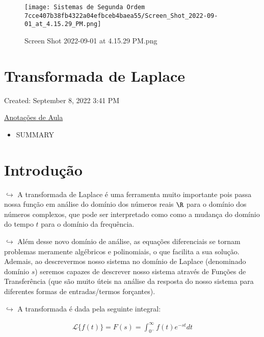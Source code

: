\documentclass[]{article}
\providecommand{\tightlist}{%
  \setlength{\itemsep}{0pt}\setlength{\parskip}{0pt}}
\begin{document}
  \begin{figure}
  \centering
  \texttt{[image: Sistemas de Segunda Ordem 7cce407b38fb4322a04efbceb4baea55/Screen\_Shot\_2022-09-01\_at\_4.15.29\_PM.png]}
  \caption{Screen Shot 2022-09-01 at 4.15.29 PM.png}
  \end{figure}

  \hypertarget{transformada-de-laplace}{%
  \section{Transformada de Laplace}\label{transformada-de-laplace}}

  Created: September 8, 2022 3:41 PM

  \href{Transformada\%20de\%20Laplace\%203ba1dd06d6854aaea26b6356883badd6/Anotac\%CC\%A7o\%CC\%83es\%20de\%20Aula\%20449f385a0f564b3a95858cc2a4879d34.md}{Anotações
  de Aula}

  \begin{itemize}
  \tightlist
  \item
    SUMMARY
  \end{itemize}

  \hypertarget{introduuxe7uxe3o-3}{%
  \section{Introdução}\label{introduuxe7uxe3o-3}}

  \(\hookrightarrow\) A transformada de Laplace é uma ferramenta muito
  importante pois passa nossa função em análise do domínio dos números
  reais \(\R\) para o domínio dos números complexos, que pode ser
  interpretado como como a mudança do domínio do tempo \(t\) para o
  domínio da frequência.

  \(\hookrightarrow\) Além desse novo domínio de análise, as equações
  diferenciais se tornam problemas meramente algébricos e polinomiais, o
  que facilita a sua solução. Ademais, ao descrevermos nosso sistema no
  domínio de Laplace (denominado domínio \(s\)) seremos capazes de
  descrever nosso sistema através de Funções de Transferência (que são
  muito úteis na análise da resposta do nosso sistema para diferentes
  formas de entradas/termos forçantes).

  \(\hookrightarrow\) A transformada é dada pela seguinte integral:

  \[
  \begin{align}
  \mathcal L\{f(t)\}  = F(s) = \int_{0^-}^{\infty}f(t)e^{-st}dt
  \end{align}
  \]
\end{document}

